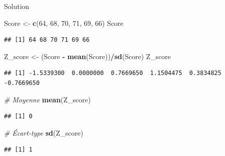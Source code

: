 \documentclass[ignorenonframetext,]{beamer}
\newenvironment{Shaded}{\begin{snugshade}}{\end{snugshade}}
\newcommand{\KeywordTok}[1]{\textcolor[rgb]{0.13,0.29,0.53}{\textbf{#1}}}
\newcommand{\DecValTok}[1]{\textcolor[rgb]{0.00,0.00,0.81}{#1}}
\newcommand{\StringTok}[1]{\textcolor[rgb]{0.31,0.60,0.02}{#1}}
\newcommand{\CommentTok}[1]{\textcolor[rgb]{0.56,0.35,0.01}{\textit{#1}}}
\newcommand{\OperatorTok}[1]{\textcolor[rgb]{0.81,0.36,0.00}{\textbf{#1}}}
\newcommand{\NormalTok}[1]{#1}
\begin{document}
\begin{frame}[fragile]{Solution}

\begin{Shaded}
\begin{Highlighting}[]
\NormalTok{Score <-}\StringTok{ }\KeywordTok{c}\NormalTok{(}\DecValTok{64}\NormalTok{, }\DecValTok{68}\NormalTok{, }\DecValTok{70}\NormalTok{, }\DecValTok{71}\NormalTok{, }\DecValTok{69}\NormalTok{, }\DecValTok{66}\NormalTok{)}
\NormalTok{Score}
\end{Highlighting}
\end{Shaded}

\begin{verbatim}
## [1] 64 68 70 71 69 66
\end{verbatim}

\begin{Shaded}
\begin{Highlighting}[]
\NormalTok{Z_score <-}\StringTok{ }\NormalTok{(Score }\OperatorTok{-}\StringTok{ }\KeywordTok{mean}\NormalTok{(Score))}\OperatorTok{/}\KeywordTok{sd}\NormalTok{(Score)}
\NormalTok{Z_score}
\end{Highlighting}
\end{Shaded}

\begin{verbatim}
## [1] -1.5339300  0.0000000  0.7669650  1.1504475  0.3834825 -0.7669650
\end{verbatim}

\begin{Shaded}
\begin{Highlighting}[]
\CommentTok{# Moyenne}
\KeywordTok{mean}\NormalTok{(Z_score)}
\end{Highlighting}
\end{Shaded}

\begin{verbatim}
## [1] 0
\end{verbatim}

\begin{Shaded}
\begin{Highlighting}[]
\CommentTok{# Écart-type}
\KeywordTok{sd}\NormalTok{(Z_score)}
\end{Highlighting}
\end{Shaded}

\begin{verbatim}
## [1] 1
\end{verbatim}

\end{frame}
\end{document}
